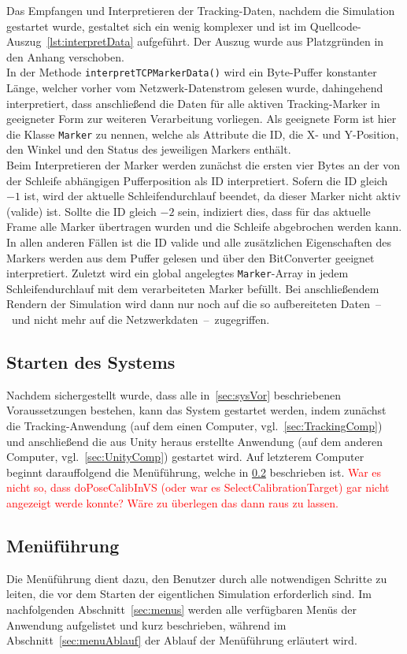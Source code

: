 Das Empfangen und Interpretieren der Tracking-Daten, nachdem die Simulation gestartet wurde, gestaltet sich ein wenig komplexer und ist im Quellcode-Auszug~\ref{lst:interpretData} aufgeführt. Der Auszug wurde aus Platzgründen in den Anhang verschoben.\\
In der Methode \texttt{interpretTCPMarkerData()} wird ein Byte-Puffer konstanter Länge, welcher vorher vom Netzwerk-Datenstrom gelesen wurde, dahingehend interpretiert, dass anschließend die Daten für alle aktiven Tracking-Marker in geeigneter Form zur weiteren Verarbeitung vorliegen. Als geeignete Form ist hier die Klasse \texttt{Marker} zu nennen, welche als Attribute die ID, die X- und Y-Position, den Winkel und den Status des jeweiligen Markers enthält.\\ 
Beim Interpretieren der Marker werden zunächst die ersten vier Bytes an der von der Schleife abhängigen Pufferposition als ID interpretiert. Sofern die ID gleich $-1$ ist, wird der aktuelle Schleifendurchlauf beendet, da dieser Marker nicht aktiv (valide) ist. Sollte die ID gleich $-2$ sein, indiziert dies, dass für das aktuelle Frame alle Marker übertragen wurden und die Schleife abgebrochen werden kann. In allen anderen Fällen ist die ID valide und alle zusätzlichen Eigenschaften des Markers werden aus dem Puffer gelesen und über den BitConverter geeignet interpretiert. Zuletzt wird ein global angelegtes \texttt{Marker}-Array in jedem Schleifendurchlauf mit dem verarbeiteten Marker befüllt. Bei anschließendem Rendern der Simulation wird dann nur noch auf die so aufbereiteten Daten~--~und nicht mehr auf die Netzwerkdaten~--~zugegriffen.

\subsection{Starten des Systems}
Nachdem sichergestellt wurde, dass alle in~\ref{sec:sysVor} beschriebenen Voraussetzungen bestehen, kann das System gestartet werden, indem zunächst die Tracking-Anwendung (auf dem einen Computer, vgl.~\ref{sec:TrackingComp}) und anschließend die aus Unity heraus erstellte Anwendung (auf dem anderen Computer, vgl.~\ref{sec:UnityComp}) gestartet wird. Auf letzterem Computer beginnt darauffolgend die Menüführung, welche in \ref{sec:menu} beschrieben ist. \textcolor{red}{War es nicht so, dass doPoseCalibInVS (oder war es SelectCalibrationTarget) gar nicht angezeigt werde konnte? Wäre zu überlegen das dann raus zu lassen.}
\subsection{Menüführung}\label{sec:menu}
Die Menüführung dient dazu, den Benutzer durch alle notwendigen Schritte zu leiten, die vor dem Starten der eigentlichen Simulation erforderlich sind. Im nachfolgenden Abschnitt~\ref{sec:menus} werden alle verfügbaren Menüs der Anwendung aufgelistet und kurz beschrieben, während im Abschnitt~\ref{sec:menuAblauf} der Ablauf der Menüführung erläutert wird.


